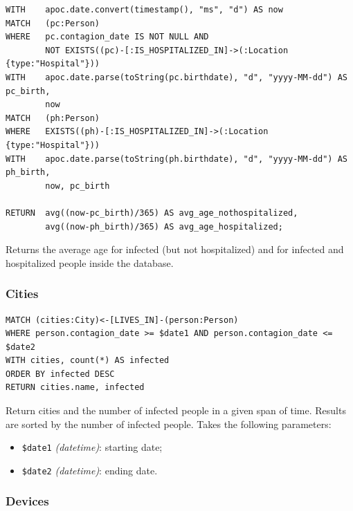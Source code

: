 \documentclass[12pt, a4paper]{article}
\begin{document}
\begin{tcolorbox}[fontupper=\scriptsize]
    \begin{verbatim}
WITH    apoc.date.convert(timestamp(), "ms", "d") AS now
MATCH   (pc:Person)
WHERE   pc.contagion_date IS NOT NULL AND
        NOT EXISTS((pc)-[:IS_HOSPITALIZED_IN]->(:Location {type:"Hospital"}))
WITH    apoc.date.parse(toString(pc.birthdate), "d", "yyyy-MM-dd") AS pc_birth,
        now
MATCH   (ph:Person)
WHERE   EXISTS((ph)-[:IS_HOSPITALIZED_IN]->(:Location {type:"Hospital"}))
WITH    apoc.date.parse(toString(ph.birthdate), "d", "yyyy-MM-dd") AS ph_birth,
        now, pc_birth

RETURN  avg((now-pc_birth)/365) AS avg_age_nothospitalized, 
        avg((now-ph_birth)/365) AS avg_age_hospitalized;
    \end{verbatim}
\end{tcolorbox}

\noindent %
Returns the average age for infected (but not hospitalized) and for infected 
and hospitalized people inside the database.

\subsubsection{Cities}

\begin{tcolorbox}[fontupper=\scriptsize]
    \begin{verbatim}
MATCH (cities:City)<-[LIVES_IN]-(person:Person) 
WHERE person.contagion_date >= $date1 AND person.contagion_date <= $date2
WITH cities, count(*) AS infected
ORDER BY infected DESC
RETURN cities.name, infected
    \end{verbatim}
\end{tcolorbox}

\noindent %
Return cities and the number of infected people in a given span of time. Results are sorted by the number of infected people. 
Takes the following parameters: 
\begin{itemize}
    \item \texttt{\$date1} \emph{(datetime)}: starting date;
    \item \texttt{\$date2} \emph{(datetime)}: ending date.
\end{itemize}

\subsubsection{Devices}
\end{document}
